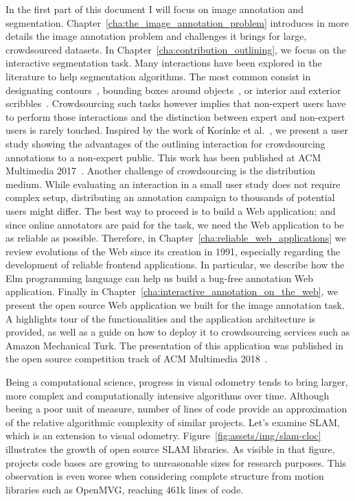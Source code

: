 In the first part of this document I will focus on image annotation and segmentation.
Chapter~\ref{cha:the_image_annotation_problem} introduces in more details
the image annotation problem and challenges it brings for large, crowdsourced datasets.
In Chapter~\ref{cha:contribution_outlining}, we focus on the interactive segmentation task.
Many interactions have been explored in the literature to help segmentation algorithms.
The most common consist in designating contours~\cite{russell2008labelme},
bounding boxes around objects~\cite{rother_grabcut:_2004},
or interior and exterior scribbles~\cite{mcguinness2010comparative}.
Crowdsourcing such tasks however implies that non-expert users have to perform
those interactions and the distinction between expert and non-expert users is rarely touched.
Inspired by the work of Korinke et al.~\cite{korinke_intuitive_2015, korinke_exploring_2015},
we present a user study showing the advantages of the outlining interaction
for crowdsourcing annotations to a non-expert public.
This work has been published at ACM Multimedia 2017~\cite{pizenberg2017outlining}.
Another challenge of crowdsourcing is the distribution medium.
While evaluating an interaction in a small user study does not require complex setup,
distributing an annotation campaign to thousands of potential users might differ.
The best way to proceed is to build a Web application;
and since online annotators are paid for the task,
we need the Web application to be as reliable as possible.
Therefore, in Chapter~\ref{cha:reliable_web_applications} we review evolutions of the Web
since its creation in 1991, especially regarding the development
of reliable frontend applications.
In particular, we describe how the Elm programming language can help us
build a bug-free annotation Web application.
Finally in Chapter~\ref{cha:interactive_annotation_on_the_web},
we present the open source Web application we built for the image annotation task.
A highlights tour of the functionalities and the application architecture is provided,
as well as a guide on how to deploy it to crowdsourcing services
such as Amazon Mechanical Turk.
The presentation of this application was published in the open source competition track
of ACM Multimedia 2018~\cite{pizenberg2018annotation}.


Being a computational science, progress in visual odometry tends to bring larger,
more complex and computationally intensive algorithms over time.
Although beeing a poor unit of measure, number of lines of code provide
an approximation of the relative algorithmic complexity of similar projects.
Let's examine SLAM, which is an extension to visual odometry.
Figure~\ref{fig:assets/img/slam-cloc} illustrates the growth of open source SLAM libraries.
As visible in that figure, projects code bases are growing to unreasonable sizes for research purposes.
This observation is even worse when considering complete structure from motion
libraries such as OpenMVG, reaching 461k lines of code.

